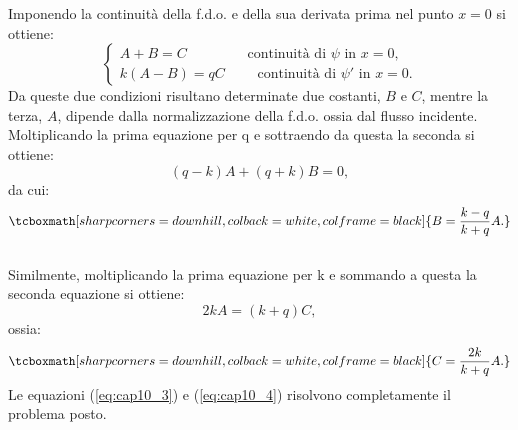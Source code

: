\documentclass[a4paper,12pt,oneside]{book}
\begin{document}
Imponendo la continuità della f.d.o. e della sua derivata prima nel punto $x=0$ si ottiene:
	\begin{equation}
		\begin{cases}
		A+B=C \quad \qquad \quad \textrm{ continuità di }\psi\textrm{ in }x=0,\\
		k\left(A-B \right) =qC\qquad \textrm{ continuità di }\psi '\textrm{ in }x=0.
		\end{cases}
	\end{equation}
Da queste due condizioni risultano determinate due costanti, $B$ e $C$, mentre la terza, $A$, dipende dalla normalizzazione della f.d.o. ossia dal flusso incidente.\\

Moltiplicando la prima equazione per q e sottraendo da questa la seconda si ottiene:
	\begin{equation}
		\left( q-k \right) A + \left( q+k \right)B=0,
	\end{equation}
da cui:
	\begin{equation}
		\tcboxmath[sharp corners=downhill, colback=white, colframe=black]{
			B= \frac{k-q}{k+q}A.
			}
	\label{eq:cap10_3}
	\end{equation}\\
	
Similmente, moltiplicando la prima equazione per k e sommando a questa la seconda equazione si ottiene:
	\begin{equation}
		2kA=\left( k+q \right)C,
	\end{equation}
ossia:
	\begin{equation}
		\tcboxmath[sharp corners=downhill, colback=white, colframe=black]{
			C=\frac{2k}{k+q}A.
			}
	\label{eq:cap10_4}
	\end{equation}
Le equazioni (\ref{eq:cap10_3}) e (\ref{eq:cap10_4}) risolvono completamente il problema posto.\\
\end{document}
